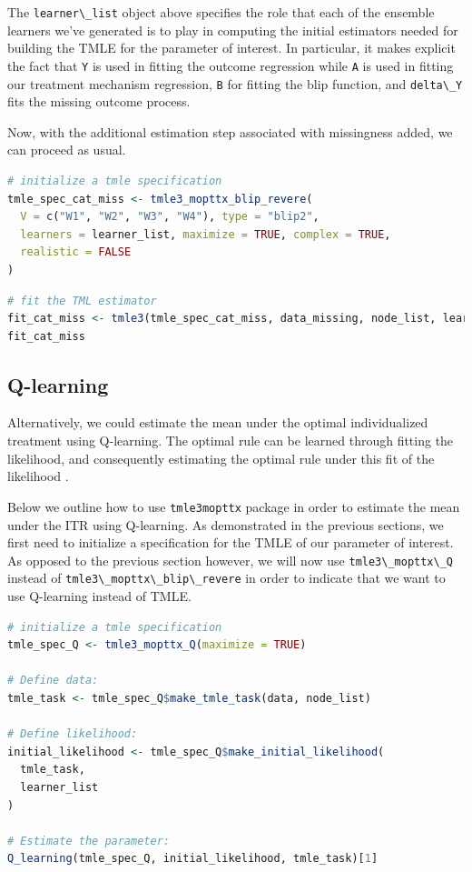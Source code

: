 \documentclass[
  12pt, krantz2,
]{krantz}
\newcommand{\passthrough}[1]{#1}
\newcommand{\1}{\mathbbm{1}}
\theoremstyle{definition}
\theoremstyle{definition}
\theoremstyle{definition}
\theoremstyle{definition}
\theoremstyle{remark}
\begin{document}
The \passthrough{\lstinline!learner\_list!} object above specifies the role that each of the ensemble
learners we've generated is to play in computing the initial estimators needed
for building the TMLE for the parameter of interest. In particular, it makes
explicit the fact that \passthrough{\lstinline!Y!} is used in fitting the outcome regression
while \passthrough{\lstinline!A!} is used in fitting our treatment mechanism regression,
\passthrough{\lstinline!B!} for fitting the blip function, and \passthrough{\lstinline!delta\_Y!} fits the missing outcome process.

Now, with the additional estimation step associated with missingness added, we can
proceed as usual.

\begin{lstlisting}[language=R]
# initialize a tmle specification
tmle_spec_cat_miss <- tmle3_mopttx_blip_revere(
  V = c("W1", "W2", "W3", "W4"), type = "blip2",
  learners = learner_list, maximize = TRUE, complex = TRUE,
  realistic = FALSE
)
\end{lstlisting}

\begin{lstlisting}[language=R]
# fit the TML estimator
fit_cat_miss <- tmle3(tmle_spec_cat_miss, data_missing, node_list, learner_list)
fit_cat_miss
\end{lstlisting}

\hypertarget{q-learning}{%
\subsection{Q-learning}\label{q-learning}}

Alternatively, we could estimate the mean under the optimal individualized
treatment using Q-learning. The optimal rule can be learned through fitting the
likelihood, and consequently estimating the optimal rule under this fit of the
likelihood \citep{Sutton1998, murphy2003}.

Below we outline how to use \passthrough{\lstinline!tmle3mopttx!} package in order to estimate the mean
under the ITR using Q-learning. As demonstrated in the previous sections, we
first need to initialize a specification for the TMLE of our parameter of
interest. As opposed to the previous section however, we will now use
\passthrough{\lstinline!tmle3\_mopttx\_Q!} instead of \passthrough{\lstinline!tmle3\_mopttx\_blip\_revere!} in order to indicate that
we want to use Q-learning instead of TMLE.

\begin{lstlisting}[language=R]
# initialize a tmle specification
tmle_spec_Q <- tmle3_mopttx_Q(maximize = TRUE)

# Define data:
tmle_task <- tmle_spec_Q$make_tmle_task(data, node_list)

# Define likelihood:
initial_likelihood <- tmle_spec_Q$make_initial_likelihood(
  tmle_task,
  learner_list
)

# Estimate the parameter:
Q_learning(tmle_spec_Q, initial_likelihood, tmle_task)[1]
\end{lstlisting}
\end{document}
